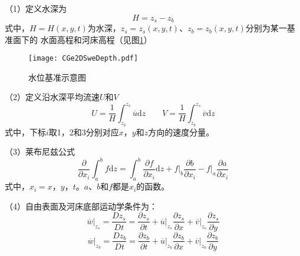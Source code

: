 （1）定义水深为
\begin{equation}
  H =  z_{s} - z_{b}
\end{equation}
式中，$H=H(x,y,t)$为水深，$ z_{s}= z_{s}(x,y,t)$、$z_{b}=z_{b}(x,y,t)$分别为某一基准面下的
水面高程和河床高程（见图\ref{FgCGe_2DSwe_depth}）

\begin{figure}[hb]
  \centering
  \texttt{[image: CGe2DSweDepth.pdf]}
  \caption{水位基准示意图}
  \label{FgCGe_2DSwe_depth}
\end{figure}

（2）定义沿水深平均流速$U$和$V$
\begin{equation}
  U
  =
  \frac{1}{H}
  \int_{z_{b}}^{ z_{s}}\!\overline{u}\mathrm{d}z
  \quad
  \quad
  V
  =
  \frac{1}{H}
  \int_{z_{b}}^{ z_{s}}\!\overline{v}\mathrm{d}z
\end{equation}
式中，下标$i$取1，2和3分别对应$x$，$y$和$z$方向的速度分量。

（3）莱布尼兹公式
\begin{equation}
  \frac{\partial}{\partial x_{i}}
  \int_{a}^{b}\!f\mathrm{d}z
  =
  \int_{a}^{b}\!
  \frac{\partial f}{\partial x_{i}}\mathrm{d}z
  +
  \left.
  f
  \right|_{b}\frac{\partial b}{\partial x_{i}}
  -
  \left.f\right|_{a}\frac{\partial a}{\partial x_{i}}
  \label{EqCGeLeibnizLaw}
\end{equation}
式中，$x_{i}=x$，$y$，$t$。$a$、$b$和$f$都是$x_{i}$的函数。

（4）自由表面及河床底部运动学条件为：
\begin{equation}
  \left.\overline{w}\right|_{z_{s}}
  =
  \frac{D z_{s}}{Dt}
  =
  \frac{\partial z_{s}}{\partial t}
  +
  \left.\overline{u}\right|_{z_{s}}\frac{\partial z_{s}}{\partial x}
  +
  \left.\overline{v}\right|_{z_{s}}\frac{\partial z_{s}}{\partial y}
  \label{EqCGeSMC}
\end{equation}
\begin{equation}
  \left.\overline{w}\right|_{z_{b}}
  =
  \frac{Dz_{b}}{Dt}
  =
  \frac{\partial z_{b}}{\partial t}
  +
  \left.\overline{u}\right|_{z_{b}}\frac{\partial z_{b}}{\partial x}
  +
  \left.\overline{v}\right|_{z_{b}}\frac{\partial z_{b}}{\partial y}
  \label{EqCGeBMC}
\end{equation}

